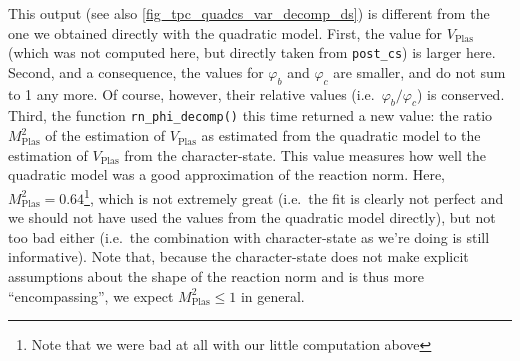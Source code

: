 \documentclass[a4paper,12pt,twoside]{article}
\begin{document}
This output (see also \autoref{fig_tpc_quadcs_var_decomp_ds}) is different from the one we obtained directly with the quadratic model. First, the value for $V_{\text{Plas}}$ (which was not computed here, but directly taken from \texttt{post\_cs}) is larger here.
Second, and a consequence, the values for $\varphi_{b}$ and $\varphi_{c}$ are smaller, and do not sum to 1 any more.
Of course, however, their relative values (i.e.\ $\varphi_{b}/\varphi_{c}$) is conserved.
Third, the function \texttt{rn\_phi\_decomp()} this time returned a new value: the ratio $M^{2}_{\text{Plas}}$ of the estimation of $V_{\text{Plas}}$ as estimated from the quadratic model to the estimation of $V_{\text{Plas}}$ from the character-state.
This value measures how well the quadratic model was a good approximation of the reaction norm.
Here, $M^{2}_{\text{Plas}} = 0.64$\footnote{Note that we were bad at all with our little computation above}, which is not extremely great (i.e.\ the fit is clearly not perfect and we should not have used the values from the quadratic model directly), but not too bad either (i.e.\ the combination with character-state as we're doing is still informative).
Note that, because the character-state does not make explicit assumptions about the shape of the reaction norm and is thus more ``encompassing'', we expect $M^{2}_{\text{Plas}} \leq 1$ in general.
\end{document}
